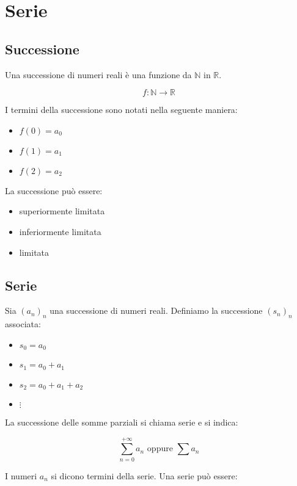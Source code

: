 \documentclass{subfiles}
\begin{document}
\section{Serie}

\subsection{Successione}

Una successione di numeri reali è una funzione da $\mathbb{N}$ in $\mathbb{R}$.

$$
f: \mathbb{N} \to \mathbb{R}
$$

\noindent
I termini della successione sono notati nella seguente maniera:

\begin{itemize}
    \item $f(0) = a_0$
    \item $f(1) = a_1$
    \item $f(2) = a_2$
\end{itemize}

\noindent
La successione può essere:

\begin{itemize}
    \item superiormente limitata
    \item inferiormente limitata
    \item limitata
\end{itemize}


\subsection{Serie}

Sia $(a_n)_n$ una successione di numeri reali. Definiamo la successione $(s_n)_n$ associata:

\begin{itemize}
    \item $s_0 = a_0$
    \item $s_1 = a_0 + a_1$
    \item $s_2 = a_0 + a_1 + a_2$
    \item $\vdots$
\end{itemize}

\noindent
La successione delle somme parziali si chiama serie e si indica:

$$
\sum_{n = 0}^{+\infty} a_n \text{ oppure } \sum a_n
$$

\noindent
I numeri $a_n$ si dicono termini della serie. Una serie può essere:
\end{document}
